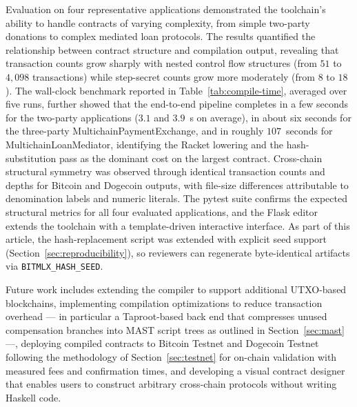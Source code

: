 \documentclass[journal]{IEEEtran}
\begin{document}
Evaluation on four representative applications demonstrated the toolchain's ability to handle contracts of varying complexity, from simple two-party donations to complex mediated loan protocols. The results quantified the relationship between contract structure and compilation output, revealing that transaction counts grow sharply with nested control flow structures (from $51$ to $4{,}098$ transactions) while step-secret counts grow more moderately (from $8$ to $18$). The wall-clock benchmark reported in Table~\ref{tab:compile-time}, averaged over five runs, further showed that the end-to-end pipeline completes in a few seconds for the two-party applications ($3.1$ and $3.9$~s on average), in about six seconds for the three-party MultichainPaymentExchange, and in roughly $107$~seconds for MultichainLoanMediator, identifying the Racket lowering and the hash-substitution pass as the dominant cost on the largest contract. Cross-chain structural symmetry was observed through identical transaction counts and depths for Bitcoin and Dogecoin outputs, with file-size differences attributable to denomination labels and numeric literals. The pytest suite confirms the expected structural metrics for all four evaluated applications, and the Flask editor extends the toolchain with a template-driven interactive interface. As part of this article, the hash-replacement script was extended with explicit seed support (Section~\ref{sec:reproducibility}), so reviewers can regenerate byte-identical artifacts via \texttt{BITMLX\_HASH\_SEED}.

Future work includes extending the compiler to support additional UTXO-based blockchains, implementing compilation optimizations to reduce transaction overhead --- in particular a Taproot-based back end that compresses unused compensation branches into MAST script trees as outlined in Section~\ref{sec:mast} ---, deploying compiled contracts to Bitcoin Testnet and Dogecoin Testnet following the methodology of Section~\ref{sec:testnet} for on-chain validation with measured fees and confirmation times, and developing a visual contract designer that enables users to construct arbitrary cross-chain protocols without writing Haskell code.
\end{document}
